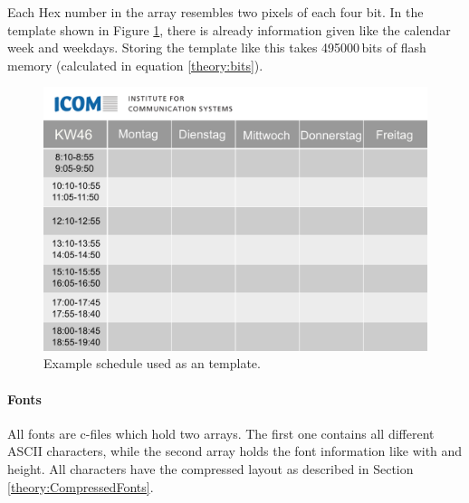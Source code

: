 Each Hex number in the array resembles two pixels of each four bit. In the template shown in Figure \ref{software:kalender}, there is already information given like the calendar week and weekdays. Storing the template like this takes 495000\,bits of flash memory (calculated in equation \eqref{theory:bits}). 
\begin{figure}[ht]
	\centering
	\includegraphics[height=0.6\textwidth]{4-development/software/graphics/Kalender.png}
	\caption{Example schedule used as an template.\label{software:kalender}}
\end{figure}


\paragraph{Fonts}
All fonts are c-files which hold two arrays.
The first one contains all different ASCII characters, while the second array holds the font information like with and height. All characters have the compressed layout as described in Section \ref{theory:CompressedFonts}.
%		

